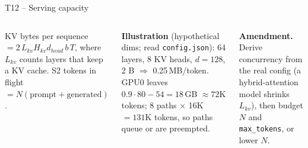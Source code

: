 \documentclass[aspectratio=169,10pt]{beamer}
\begin{document}
\begin{frame}{T12 -- Serving capacity}
\begin{columns}[T]
\begin{theorem}[T12]\small
KV bytes per sequence $=2\,L_{kv}H_{kv}d_{head}\,b\,T$, where $L_{kv}$ counts layers that keep a KV cache. S2 tokens in flight $=N(\text{prompt}+\text{generated})$.
\end{theorem}
\small\textbf{Illustration} (hypothetical dims; read \texttt{config.json}): 64 layers, 8 KV heads, $d{=}128$, 2 B $\Rightarrow$ 0.25\,MB/token. GPU0 leaves $0.9{\cdot}80-54=18$\,GB $\approx72$K tokens; 8 paths $\times$ 16K $=131$K tokens, so paths queue or are preempted.

\textbf{Amendment.} Derive concurrency from the real config (a hybrid-attention model shrinks $L_{kv}$), then budget $N$ and \texttt{max\_tokens}, or lower $N$.
\end{columns}
\end{frame}
\end{document}
